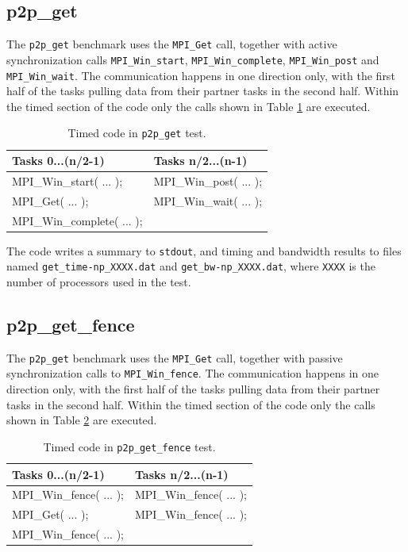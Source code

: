 \documentclass[10pt,a4paper]{report}
\begin{document}
\subsection{p2p\_get}
The \verb+p2p_get+ benchmark uses the \verb+MPI_Get+ call, together with active synchronization calls \verb+MPI_Win_start+, \verb+MPI_Win_complete+, \verb+MPI_Win_post+ and \verb+MPI_Win_wait+. The communication happens in one direction only, with the first half of the tasks pulling data from their partner tasks in the second half. Within the timed section of the code only the calls shown in Table \ref{tab:get} are executed.

\begin{table}[ht]
\centering
\caption{Timed code in \texttt{p2p\_get} test.}
\label{tab:get}
\begin{tabular}{|l|l|}
\hline
\bf{Tasks 0...(n/2-1)}	   & \bf{Tasks n/2...(n-1)}\\\hline
MPI\_Win\_start( ... );    & MPI\_Win\_post( ... );\\
MPI\_Get( ... );           & MPI\_Win\_wait( ... );\\
MPI\_Win\_complete( ... ); & \\\hline
\end{tabular}
\end{table}

The code writes a summary to \verb+stdout+, and timing and bandwidth results to files named \verb+get_time-np_XXXX.dat+ and \verb+get_bw-np_XXXX.dat+, where \verb+XXXX+ is the number of processors used in the test.

\FloatBarrier
\subsection{p2p\_get\_fence}
The \verb+p2p_get+ benchmark uses the \verb+MPI_Get+ call, together with passive synchronization calls to \verb+MPI_Win_fence+. The communication happens in one direction only, with the first half of the tasks pulling data from their partner tasks in the second half. Within the timed section of the code only the calls shown in Table \ref{tab:get_fence} are executed.

\begin{table}[ht]
\centering
\caption{Timed code in \texttt{p2p\_get\_fence} test.}
\label{tab:get_fence}
\begin{tabular}{|l|l|}
\hline
\bf{Tasks 0...(n/2-1)}	   & \bf{Tasks n/2...(n-1)}\\\hline
MPI\_Win\_fence( ... );    & MPI\_Win\_fence( ... );\\
MPI\_Get( ... );           & MPI\_Win\_fence( ... );\\
MPI\_Win\_fence( ... ); & \\\hline
\end{tabular}
\end{table}
\end{document}

